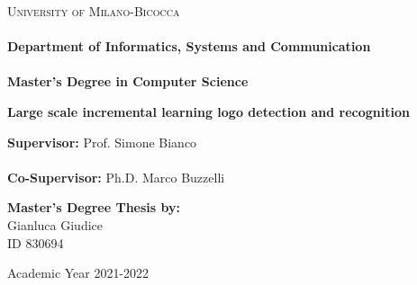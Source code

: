 \documentclass[corpo=11pt,english,numerazioneromana]{toptesi}
\begin{document}
\english



\begin{titlepage}
  \noindent
	\begin{minipage}[t]{0.21\textwidth}
	\end{minipage}
	\begin{minipage}[t]{0.79\textwidth}
	{
{\textsc{University of Milano-Bicocca}} \\\\
\textbf{Department of Informatics, Systems and Communication} \\\\
\textbf{Master's Degree in Computer Science} \\
	\par
	}
	\end{minipage}
	\vspace{25mm}
	
	\begin{center}{\Huge{\textbf{Large scale incremental learning logo detection and recognition}\par}}
	\end{center}        
	\vspace{25mm}
	\noindent
	{\large \textbf{Supervisor:} Prof. Simone Bianco} \\\\
	{\large \textbf{Co-Supervisor:} Ph.D. Marco Buzzelli} \\        
	\vspace{20mm}
	\begin{flushright}
		{\large \textbf{Master's Degree Thesis by:}} \\
\vspace{2mm}
\large{Gianluca Giudice} \\
\vspace{2mm}
\large{ID 830694} \\
	\end{flushright}
	\vspace{25mm}
	\begin{center}
		{\large{Academic Year 2021-2022}}
	\end{center}
\end{titlepage}
	
\end{document}
